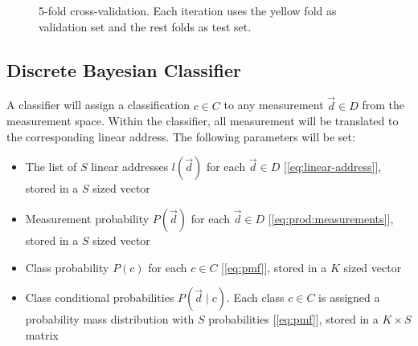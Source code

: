 \documentclass[letterpaper, conference]{IEEEtran}
\begin{document}
\begin{figure}\label{eq:v-fold}
  \caption{5-fold cross-validation. Each iteration uses the yellow fold as validation set and the rest folds as test set.}
\end{figure}
  

\subsection{Discrete Bayesian Classifier}

A classifier will assign a classification $c \in C$ to any measurement $\vec{d} \in D$ from the measurement space. Within the classifier, all measurement will be translated to the corresponding linear address. The following parameters will be set:

\begin{itemize}
  \item The list of $S$ linear addresses $l(\vec{d})$ for each $\vec{d} \in D$ [\ref{eq:linear-address}], stored in a $S$ sized vector
  \item Measurement probability $P(\vec{d})$ for each  $\vec{d} \in D$ [\ref{eq:prod:measurements}], stored in a $S$ sized vector
  \item Class probability $P(c)$ for each  $c \in C$ [\ref{eq:pmf}], stored in a $K$ sized vector
  \item Class conditional probabilities $P(\vec{d} \mid c)$. Each class $c \in C$ is assigned a probability mass distribution with $S$ probabilities [\ref{eq:pmf}], stored in a $K \times S$ matrix
\end{itemize}
\end{document}
